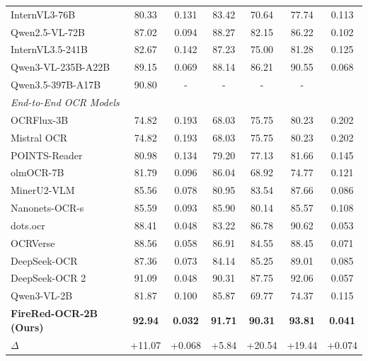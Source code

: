 \begin{table}[t]
{\begin{tabular}{lcccccc}
        InternVL3-76B~\cite{zhu2025internvl3} & 80.33 & 0.131 & 83.42 & 70.64 & 77.74 & 0.113 \\
        Qwen2.5-VL-72B~\cite{Qwen2.5-VL} & 87.02 & 0.094 & 88.27 & 82.15 & 86.22 & 0.102 \\
        InternVL3.5-241B~\cite{wang2025internvl3} & 82.67 & 0.142 & 87.23 & 75.00 & 81.28 & 0.125 \\
        Qwen3-VL-235B-A22B~\cite{bai2025qwen3} & 89.15 & 0.069 & 88.14 & 86.21 & 90.55 & 0.068 \\
        Qwen3.5-397B-A17B~\cite{qwen3.5} & 90.80 & - & -&- & -\\
        
        \midrule
        \multicolumn{7}{l}{\textit{End-to-End OCR Models}} \\
        OCRFlux-3B~\cite{OCRFlux} & 74.82 & 0.193 & 68.03 & 75.75 & 80.23 & 0.202 \\
        Mistral OCR~\cite{mistral-ocr} & 74.82 & 0.193 & 68.03 & 75.75 & 80.23 & 0.202 \\
        POINTS-Reader~\cite{liu2025points} & 80.98 & 0.134 & 79.20 & 77.13 & 81.66 & 0.145 \\
        olmOCR-7B~\cite{olmocrbench} & 81.79 & 0.096 & 86.04 & 68.92 & 74.77 & 0.121 \\
        MinerU2-VLM~\cite{wang2024mineru} & 85.56 & 0.078 & 80.95 & 83.54 & 87.66 & 0.086 \\
        Nanonets-OCR-s~\cite{Nanonets-OCR-S} & 85.59 & 0.093 & 85.90 & 80.14 & 85.57 & 0.108 \\
        dots.ocr~\cite{li2025dots} & 88.41 & 0.048 & 83.22 & 86.78 & 90.62 & 0.053 \\
        OCRVerse~\cite{zhong2026ocrverse} & 88.56 & 0.058 & 86.91 & 84.55 & 88.45 & 0.071 \\
        DeepSeek-OCR~\cite{wei2025deepseek} & 87.36 & 0.073 & 84.14 & 85.25 & 89.01 & 0.085 \\
        DeepSeek-OCR 2~\cite{wei2026deepseek} & 91.09 & 0.048 & 90.31 & 87.75 & 92.06 & 0.057 \\
        \hdashline
        Qwen3-VL-2B~\cite{bai2025qwen3} & 81.87 & 0.100 & 85.87 & 69.77 & 74.37 & 0.115 \\
        \rowcolor{red!10}\textbf{FireRed-OCR-2B (Ours)} & \textbf{92.94} & \textbf{0.032} & \textbf{91.71} & \textbf{90.31} & \textbf{93.81} & \textbf{0.041} \\
        $\Delta$ & +11.07 & +0.068 & +5.84 & +20.54 & +19.44 & +0.074 \\
       
        \bottomrule
    \end{tabular}
    }
\end{table}

